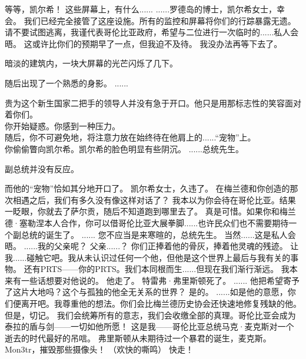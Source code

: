 \documentclass[openany]{book}
\begin{document}
\begin{dialogue}
     等等，凯尔希！
     这些屏幕上，有什么......
     ......罗德岛的博士，凯尔希女士，幸会。
     我们已经完全接管了这座设施。所有的监控和屏幕将你们的行踪暴露无遗。
     请不要试图逃离，我谨代表哥伦比亚政府，希望与二位进行一次临时的......私人会晤。
     这或许比你们的预期早了一点，但我迫不及待。
     我没办法再等下去了。\par
    暗淡的建筑内，一块大屏幕的光芒闪烁了几下。\par
    随后出现了一个熟悉的身影。
     ......\par
    贵为这个新生国家二把手的领导人并没有急于开口。他只是用那标志性的笑容面对着你们。\\
    你开始疑惑。你感到一种压力。\\
    随后，你不可避免地，将注意力放在始终待在他肩上的......“宠物”上。\\
    你偷偷瞥向凯尔希。凯尔希的脸色明显有些阴沉。
     ......总统先生。\par
    副总统并没有反应。\par
    而他的“宠物”恰如其分地开口了。
     凯尔希女士，久违了。
     在梅兰德和你创造的那次相遇之后，我们有多久没有像这样对话了？
     我本以为你会待在哥伦比亚。结果一眨眼，你就去了萨尔贡，随后不知道跑到哪里去了。
     真是可惜。如果你和梅兰德·塞勒涅本人合作，你可以借哥伦比亚大展拳脚......也许民众们也不需要期待一个副总统的诞生了。
     ......
     您不应当是来寒暄的，总统先生。
     当然......这是私人会晤。
     ......我的父亲呢？
     父亲......？
     你们正捧着他的骨灰，捧着他灵魂的残迹。
     让我......碰触它吧。我从未认识过任何一个他，但他是这个世界上最后与我有关的事物。
     还有PRTS——你的PRTS。我们本同根而生......但现在我们渐行渐远。
     我本来有一些话想要对他说的。
     他走了。
     特雷弗·弗里斯顿死了。
     ......
     他把希望寄予了这片大地吗？这个与孤独的他全无关系的世界？
     是的。
     ......如是他的意愿，你们便离开吧。我尊重他的想法。你们会比梅兰德历史协会还快速地修复残缺的他。
     但是，切记。
     我们会统筹所有的意志，我们会收缴全部的真理。哥伦比亚会成为泰拉的盾与剑——一切如他所愿！
     这是我——哥伦比亚总统马克·麦克斯对一个逝去的时代最好的吊唁。
     弗里斯顿从未期待过一个暴君的诞生，麦克斯。
     Mon3tr，摧毁那些摄像头！
     （欢快的嘶鸣）
     快走！
\end{dialogue}
\end{document}
